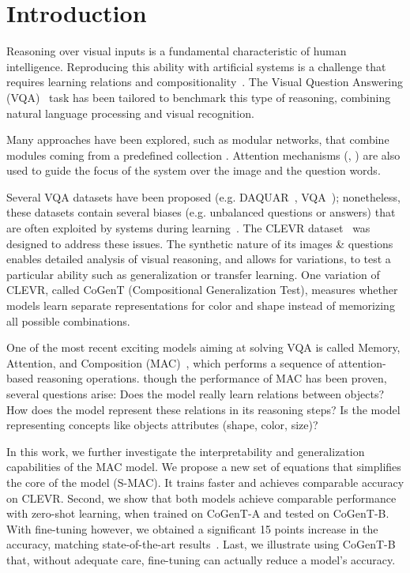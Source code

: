 \section{Introduction}
Reasoning over visual inputs is a fundamental characteristic of human intelligence.
Reproducing this ability with artificial systems is a challenge that requires learning relations and compositionality~\cite{hu2017learning, johnson2017inferring}. The Visual Question Answering (VQA)~\cite{antol2015vqa,malinowski2014towards,wu2017visual} task has been tailored to benchmark this type of reasoning, combining natural language processing and visual recognition.

Many approaches have been explored, such as modular networks, that combine modules coming from a predefined collection \cite{andreas2016learning,johnson2017inferring, mascharka2018transparency}. Attention mechanisms (\cite{bahdanau2014neural}, \cite{xu2015show}) are also used to guide the focus of the system over the image and the question words.

Several VQA datasets have been proposed (e.g. DAQUAR~\cite{malinowski2014multi}, VQA~\cite{antol2015vqa}); nonetheless, these datasets contain several biases (e.g. unbalanced questions or answers) that are often exploited by systems during learning~\cite{goyal2017making}.
The CLEVR dataset~\cite{johnson2017clevr} was designed to address these issues. The synthetic nature of its images \& questions enables detailed analysis of visual reasoning, and allows for variations, to test a particular ability such as generalization or transfer learning. One variation of CLEVR, called CoGenT (Compositional Generalization Test), measures whether models learn separate representations for color and shape instead of memorizing all possible combinations. 


One of the most recent exciting models aiming at solving VQA is called Memory, Attention, and Composition (MAC)~\cite{hudson2018compositional}, which performs a sequence of attention-based reasoning operations. 
though the performance of MAC has been proven, several questions arise:
Does the model really learn relations between objects? 
How does the model represent these relations in its reasoning steps? 
Is the model representing concepts like objects attributes (shape, color, size)?

In this work, we further investigate the interpretability and generalization capabilities of the MAC model.
We propose a new set of equations that simplifies the core of the model (S-MAC). It trains faster and achieves comparable accuracy on CLEVR. 
Second, we show that both models achieve comparable performance with zero-shot learning, when trained on CoGenT-A and tested on CoGenT-B. With fine-tuning however, we obtained a significant 15 points increase in the accuracy, matching state-of-the-art results~\cite{perez2017film, mascharka2018transparency}.
Last, we illustrate using CoGenT-B that, without adequate care, fine-tuning can actually reduce a model's accuracy.

